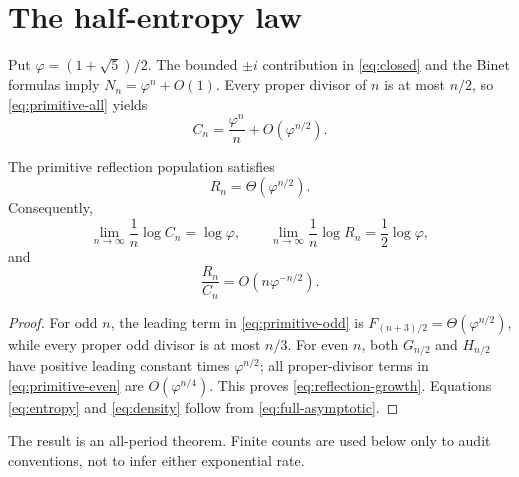\section{The half-entropy law}

Put $\varphi=(1+\sqrt5)/2$.  The bounded $\pm i$ contribution in
\eqref{eq:closed} and the Binet formulas imply
$N_n=\varphi^n+O(1)$.  Every proper divisor of $n$ is at most $n/2$, so
\eqref{eq:primitive-all} yields
\begin{equation}\label{eq:full-asymptotic}
C_n=\frac{\varphi^n}{n}+O(\varphi^{n/2}).
\end{equation}

\begin{theorem}\label{thm:entropy}
The primitive reflection population satisfies
\begin{equation}\label{eq:reflection-growth}
R_n=\Theta(\varphi^{n/2}).
\end{equation}
Consequently,
\begin{equation}\label{eq:entropy}
\lim_{n\to\infty}\frac1n\log C_n=\log\varphi,
\qquad
\lim_{n\to\infty}\frac1n\log R_n=\frac12\log\varphi,
\end{equation}
and
\begin{equation}\label{eq:density}
\frac{R_n}{C_n}=O\!\left(n\varphi^{-n/2}\right).
\end{equation}
\end{theorem}

\begin{proof}
For odd $n$, the leading term in \eqref{eq:primitive-odd} is
$F_{(n+3)/2}=\Theta(\varphi^{n/2})$, while every proper odd divisor is at most
$n/3$.  For even $n$, both $G_{n/2}$ and $H_{n/2}$ have positive leading
constant times $\varphi^{n/2}$; all proper-divisor terms in
\eqref{eq:primitive-even} are $O(\varphi^{n/4})$.  This proves
\eqref{eq:reflection-growth}.  Equations \eqref{eq:entropy} and
\eqref{eq:density} follow from \eqref{eq:full-asymptotic}.
\end{proof}

The result is an all-period theorem.  Finite counts are used below only to
audit conventions, not to infer either exponential rate.
